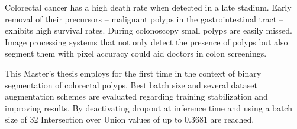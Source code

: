Colorectal cancer has a high death rate when detected in a late stadium.
Early removal of their precursors -- malignant polyps in the gastrointestinal tract -- exhibits high survival rates.
During colonoscopy small polyps are easily missed.
Image processing systems that not only detect the presence of polyps but also segment them with pixel accuracy could aid doctors in colon screenings.

This Master's thesis employs  for the first time in the context of binary segmentation of colorectal polyps.
Best batch size and several dataset augmentation schemes are evaluated regarding training stabilization and improving results.
By deactivating dropout at inference time and using a batch size of 32 Intersection over Union values of up to 0.3681 are reached.
